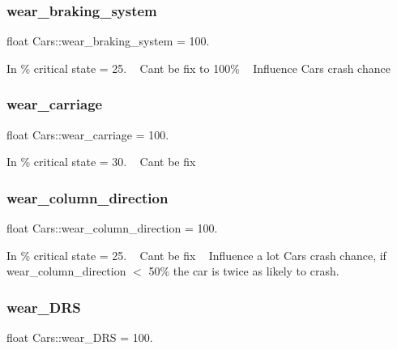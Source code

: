 \subsubsection{\texorpdfstring{wear\+\_\+braking\+\_\+system}{wear\_braking\_system}}
{\footnotesize\ttfamily float Cars\+::wear\+\_\+braking\+\_\+system = 100.}

In \% critical state = 25. ~\newline
 Can\textquotesingle{}t be fix to 100\% ~\newline
 Influence Car\textquotesingle{}s crash chance \mbox{\label{class_cars_aadc6f4dcd0a8b9a0241606e7ca211b7c}} 
\subsubsection{\texorpdfstring{wear\+\_\+carriage}{wear\_carriage}}
{\footnotesize\ttfamily float Cars\+::wear\+\_\+carriage = 100.}

In \% critical state = 30. ~\newline
 Can\textquotesingle{}t be fix \mbox{\label{class_cars_a7de567dc506302b9521cd58e4f85b233}} 
\subsubsection{\texorpdfstring{wear\+\_\+column\+\_\+direction}{wear\_column\_direction}}
{\footnotesize\ttfamily float Cars\+::wear\+\_\+column\+\_\+direction = 100.}

In \% critical state = 25. ~\newline
 Can\textquotesingle{}t be fix ~\newline
 Influence a lot Car\textquotesingle{}s crash chance, if wear\+\_\+column\+\_\+direction $<$ 50\% the car is twice as likely to crash. \mbox{\label{class_cars_a0a8a4ceeb5baa9fa0e473b80a9202d47}} 
\subsubsection{\texorpdfstring{wear\+\_\+\+D\+RS}{wear\_DRS}}
{\footnotesize\ttfamily float Cars\+::wear\+\_\+\+D\+RS = 100.}

